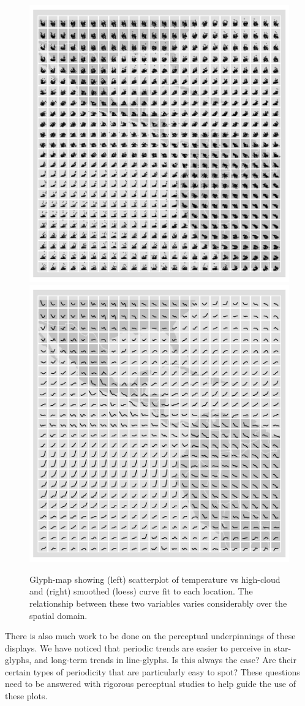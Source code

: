 \documentclass[oneside]{article}
\begin{document}
\begin{figure}[htbp]
  \centering
  \includegraphics[width=0.5\linewidth]{nasa-scat-glyph}%
  \includegraphics[width=0.5\linewidth]{nasa-loess-glyph}

  \caption{Glyph-map showing (left) scatterplot of temperature vs high-cloud and (right) smoothed (loess) curve fit to each location. The relationship between these two variables varies considerably over the spatial domain. }
  \label{fig:cloud}
\end{figure}

There is also much work to be done on the perceptual underpinnings of these displays. We have noticed that periodic trends are easier to perceive in star-glyphs, and long-term trends in line-glyphs. Is this always the case? Are their certain types of periodicity that are particularly easy to spot? These questions need to be answered with rigorous perceptual studies to help guide the use of these plots.


\end{document}
